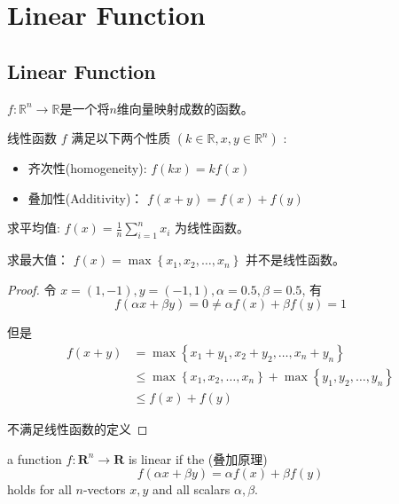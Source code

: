 \chapter{Linear Function}

\section{Linear Function}

\begin{definition}
    $f: \mathbb{R}^{n} \rightarrow \mathbb{R}$是一个将$n$维向量映射成数的函数。 

    线性函数 $ f $ 满足以下两个性质 $ \left(k \in \mathbb{R}, x, y \in \mathbb{R}^{n}\right) $ :

    \begin{itemize}
        \item 齐次性(homogeneity): $ f(k x)=k f(x) $
        \item 叠加性(Additivity)： $ f(x+y)=f(x)+f(y) $
    \end{itemize}
\end{definition}

\begin{example}
    求平均值: $ f(x)=\frac{1}{n} \sum_{i=1}^{n} x_{i} $ 为线性函数。 
\end{example}

\begin{example}
    求最大值： $ f(x)=\max \left\{x_{1}, x_{2}, \ldots, x_{n}\right\} $ 并不是线性函数。 
\end{example}

\begin{proof}
   令 $ x=(1,-1), y=(-1,1), \alpha=0.5, \beta=0.5 $, 
   有 $$ f(\alpha x+\beta y)=0 \neq \alpha f(x)+\beta f(y)=1 $$

    但是
   $$ \begin{aligned} f(x+y) 
    &=\max \left\{x_{1}+y_{1}, x_{2}+y_{2}, \ldots, x_{n}+y_{n}\right\} 
    \\ & \leq \max \left\{x_{1}, x_{2}, \ldots, x_{n}\right\}+\max \left\{y_{1}, y_{2}, \ldots, y_{n}\right\} 
    \\ & \leq f(x)+f(y) \end{aligned} $$

    不满足线性函数的定义
\end{proof}

\begin{theorem}
        a function $ f: \mathbf{R}^{n} \rightarrow \mathbf{R} $ is linear if the  (叠加原理)
    $$
    f(\alpha x+\beta y)=\alpha f(x)+\beta f(y)
    $$
    holds for all $ n $-vectors $ x, y $ and all scalars $ \alpha, \beta $.
    
\end{theorem}

